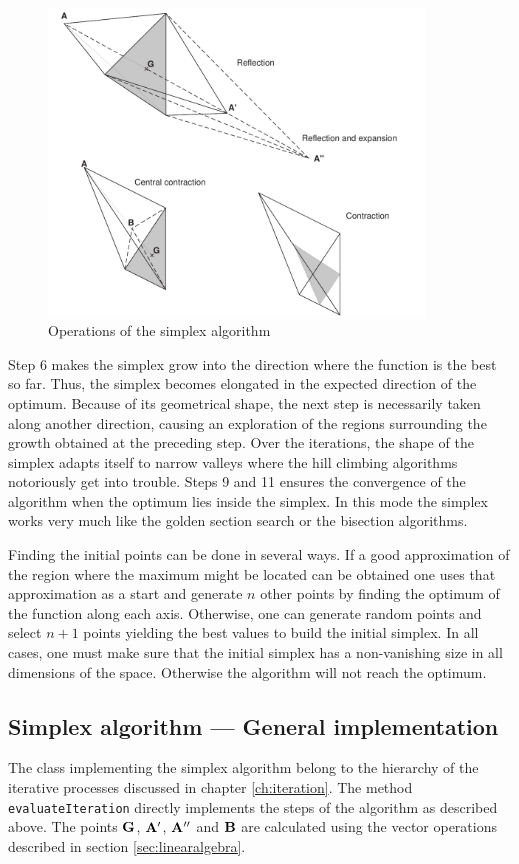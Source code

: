 \documentclass[twoside]{book}
\begin{document}
\begin{figure}
\centering\includegraphics[width=10cm]{Figures/Simplex}
\caption{Operations of the simplex
algorithm}\label{fig:simplexsample}
\end{figure}
Step 6 makes the simplex grow into the direction where the
function is the best so far. Thus, the simplex becomes elongated
in the expected direction of the optimum. Because of its
geometrical shape, the next step is necessarily taken along
another direction, causing an exploration of the regions
surrounding the growth obtained at the preceding step. Over the
iterations, the shape of the simplex adapts itself to narrow
valleys where the hill climbing algorithms notoriously get into
trouble. Steps 9 and 11 ensures the convergence of the algorithm
when the optimum lies inside the simplex. In this mode the simplex
works very much like the golden section search or the bisection
algorithms.

Finding the initial points can be done in several ways. If a good
approximation of the region where the maximum might be located can
be obtained one uses that approximation as a start and generate
$n$ other points by finding the optimum of the function along each
axis. Otherwise, one can generate random points and select $n+1$
points yielding the best values to build the initial simplex. In
all cases, one must make sure that the initial simplex has a
non-vanishing size in all dimensions of the space. Otherwise the
algorithm will not reach the optimum.

\subsection{Simplex algorithm --- General implementation}
The class implementing the simplex algorithm belong to the
hierarchy of the iterative processes discussed in chapter
\ref{ch:iteration}. The method {\tt evaluateIteration} directly
implements the steps of the algorithm as described above. The
points ${\bf G}$, ${\bf A}^{\prime}$, ${\bf A}^{\prime\prime}$ and
${\bf B}$ are calculated using the vector operations described in
section \ref{sec:linearalgebra}.
\end{document}
